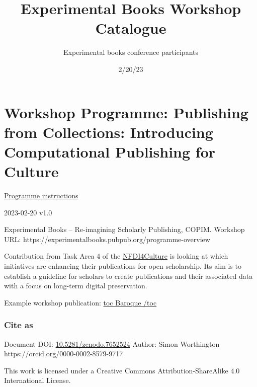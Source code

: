 \documentclass[
  letterpaper,
]{book}
\title{Experimental Books Workshop Catalogue}
\author{Experimental books conference participants}
\date{2/20/23}
\renewcommand*\contentsname{Table of contents}
\newcommand\contentsname{Table of contents}
\begin{document}
\frontmatter
\maketitle
\ifdefined\Shaded\renewenvironment{Shaded}{\begin{tcolorbox}[sharp corners, boxrule=0pt, borderline west={3pt}{0pt}{shadecolor}, enhanced, interior hidden, frame hidden, breakable]}{\end{tcolorbox}}\fi

\renewcommand*\contentsname{Table of contents}
{
\setcounter{tocdepth}{2}
\tableofcontents
}
\mainmatter
{}

\hypertarget{workshop-programme-publishing-from-collections-introducing-computational-publishing-for-culture}{%
\chapter{Workshop Programme: Publishing from Collections: Introducing
Computational Publishing for
Culture}\label{workshop-programme-publishing-from-collections-introducing-computational-publishing-for-culture}}

\href{https://mrchristian.github.io/Workshop-Publishing-from-Collections/}{Programme
instructions}

2023-02-20 v1.0

Experimental Books -- Re-imagining Scholarly Publishing, COPIM. Workshop
URL: https://experimentalbooks.pubpub.org/programme-overview

Contribution from Task Area 4 of the
\href{https://nfdi4culture.de/}{NFDI4Culture} is looking at which
initiatives are enhancing their publications for open scholarship. Its
aim is to establish a guideline for scholars to create publications and
their associated data with a focus on long-term digital preservation.

Example workshop publication:
\href{https://simonxix.github.io/Experimental_Books_workshop/}{toc
Baroque /toc}

\hypertarget{cite-as}{%
\subsection{Cite as~}\label{cite-as}}

Document DOI:
\href{https://doi.org/10.5281/zenodo.7652524}{10.5281/zenodo.7652524}
\textbar{} Author: Simon Worthington
https://orcid.org/0000-0002-8579-9717

This work is licensed under a Creative Commons Attribution-ShareAlike
4.0 International License.
\end{document}
